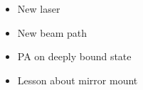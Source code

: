 \documentclass{beamer}
\begin{document}

\begin{frame}{}
  \begin{center}
    \begin{columns}
      \column{6.5cm}
      \column{4cm}
      \begin{block}{}
        \begin{itemize}
        \item<2-> New laser
        \item<3-> New beam path
        \item<4-> PA on deeply bound state
        \item<5-> Lesson about mirror mount
        \end{itemize}
      \end{block}
    \end{columns}
  \end{center}
\end{frame}

\end{document}
